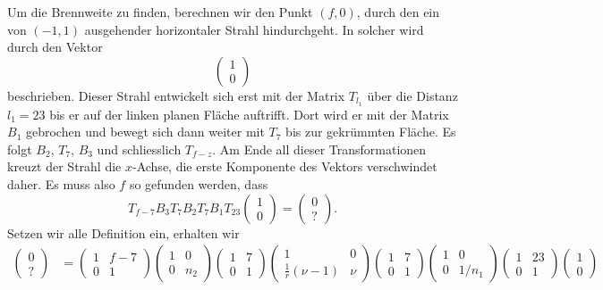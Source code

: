 \begin{loesung}
Um die Brennweite zu finden, berechnen wir den Punkt $(f,0)$, durch den
ein von $(-1,1)$ ausgehender horizontaler Strahl hindurchgeht.
In solcher wird durch den Vektor
\[
\begin{pmatrix}1\\0\end{pmatrix}
\]
beschrieben.
Dieser Strahl entwickelt sich erst mit der Matrix $T_{l_1}$ über die Distanz
$l_1 = 23$ bis er auf der linken planen Fläche auftrifft.
Dort wird er mit der Matrix $B_1$ gebrochen und bewegt sich dann
weiter mit $T_{7}$ bis zur gekrümmten Fläche.
Es folgt $B_2$, $T_7$, $B_3$ und schliesslich $T_{f-z}$.
Am Ende all dieser Transformationen kreuzt der Strahl die $x$-Achse, die erste
Komponente des Vektors verschwindet daher.
Es muss also $f$ so gefunden werden, dass
\[
T_{f-7}
B_3
T_{7}
B_2
T_{7}
B_1
T_{23}
\begin{pmatrix}1\\0\end{pmatrix}
=
\begin{pmatrix} 0 \\ ? \end{pmatrix}.
\]
Setzen wir alle Definition ein, erhalten wir
\begin{align*}
\begin{pmatrix}0\\?\end{pmatrix}
&=
\begin{pmatrix}1&f-7\\0&1\end{pmatrix}
\begin{pmatrix}1&0\\0&n_2\end{pmatrix}
\begin{pmatrix}1&7\\0&1\end{pmatrix}
\begin{pmatrix}1&0\\\frac1r(\nu-1)&\nu\end{pmatrix}
\begin{pmatrix}1&7\\0&1\end{pmatrix}
\begin{pmatrix}1&0\\0&1/n_1\end{pmatrix}
\begin{pmatrix}1&23\\0&1\end{pmatrix}
\begin{pmatrix}1\\0\end{pmatrix}

\end{align*}
\end{loesung}
